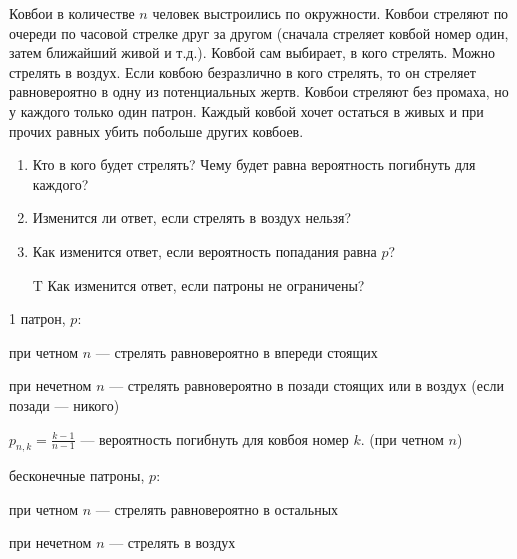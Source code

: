 \begin{problem}[Ковбои]
Ковбои в количестве $n$ человек выстроились по окружности. Ковбои стреляют по очереди по часовой стрелке друг за другом (сначала стреляет ковбой номер один, затем ближайший живой и т.д.). Ковбой сам выбирает, в кого стрелять. Можно стрелять в воздух. Если ковбою безразлично в кого стрелять, то он стреляет равновероятно в одну из потенциальных жертв. Ковбои стреляют без промаха, но у каждого только один патрон. Каждый ковбой хочет остаться в живых и при прочих равных убить побольше других ковбоев.\par
\begin{enumerate}
\item  Кто в кого будет стрелять? Чему будет равна вероятность погибнуть для каждого? \par
\item Изменится ли ответ, если стрелять в воздух нельзя? \par
\item  Как изменится ответ, если вероятность попадания равна $p$? \par
\item[T] Как изменится ответ, если патроны не ограничены?
\end{enumerate}


\begin{sol}
1 патрон, $p$: \par
при четном $n$ — стрелять равновероятно в впереди стоящих \par
при нечетном $n$ — стрелять равновероятно в позади стоящих или в воздух (если позади — никого) \par
$p_{n,k}=\frac{k-1}{n-1}$ — вероятность погибнуть для ковбоя номер $k$. (при четном $n$) \par
бесконечные патроны, $p$: \par
при четном $n$ — стрелять равновероятно в остальных \par
при нечетном $n$ — стрелять в воздух
\end{sol}
\end{problem}



